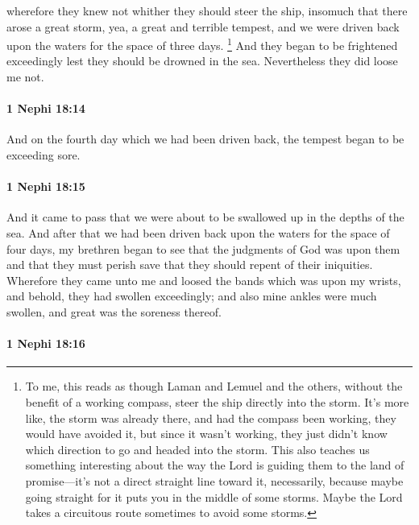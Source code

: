 			wherefore they knew not whither they should steer the ship,
			insomuch that there arose a great storm,
			yea, a great and terrible tempest,
			and we were driven back upon the waters for the space of three days.%
				\footnote{%
					\label{1NEPHI-18-13-NOTE-storm}%
					To me, this reads as though Laman and Lemuel and the others, without the benefit of a working compass, steer the ship directly into the storm. It's more like, the storm was already there, and had the compass been working, they would have avoided it, but since it wasn't working, they just didn't know which direction to go and headed into the storm. This also teaches us something interesting about the way the Lord is guiding them to the land of promise---it's not a direct straight line toward it, necessarily, because maybe going straight for it puts you in the middle of some storms. Maybe the Lord takes a circuitous route sometimes to avoid some storms.
					}
			And they began to be frightened exceedingly
			lest they should be drowned in the sea.
			Nevertheless they did loose me not.

		\paragraph{1 Nephi 18:14} %
			\label{1NEPHI-18-14}

			And on the fourth day which we had been driven back,
			the tempest began to be exceeding sore.

		\paragraph{1 Nephi 18:15} %
			\label{1NEPHI-18-15}

			And it came to pass that we were about to be swallowed up in the depths of the sea.
			And after that we had been driven back upon the waters for the space of four days,
			my brethren began to see that the judgments of God was upon them
			and that they must perish save that they should repent of their iniquities.
			Wherefore they came unto me and loosed the bands which was upon my wrists,
			and behold, they had swollen exceedingly;
			and also mine ankles were much swollen,
			and great was the soreness thereof.

		\paragraph{1 Nephi 18:16} %
			\label{1NEPHI-18-16}


